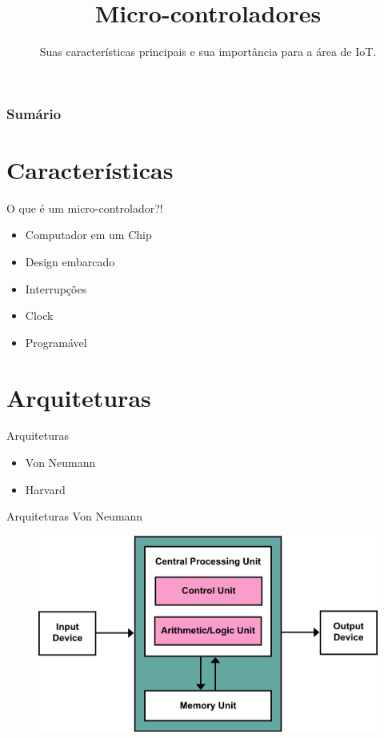 \documentclass[t]{beamer}
\title{Micro-controladores}
\subtitle{Suas características principais e sua importância para a área de IoT.}
\begin{document}
\frame{\titlepage}

\begin{frame}
\frametitle{Sumário}
\tableofcontents
\end{frame}

\section{Características}

\begin{frame}{O que é um micro-controlador?!}
\begin{itemize}
	\item Computador em um Chip
	\item Design embarcado
	\item Interrupções
	\item Clock
	\item Programável
\end{itemize}
\end{frame}

\section{Arquiteturas}

\begin{frame}{Arquiteturas}
\begin{itemize}
	\item Von Neumann
	\item Harvard
\end{itemize}
\end{frame}

\begin{frame}{Arquiteturas}
Von Neumann

\begin{figure}
\includegraphics[width=\linewidth]{arquiteturavonneumann}
\end{figure}
\end{frame}
\end{document}
